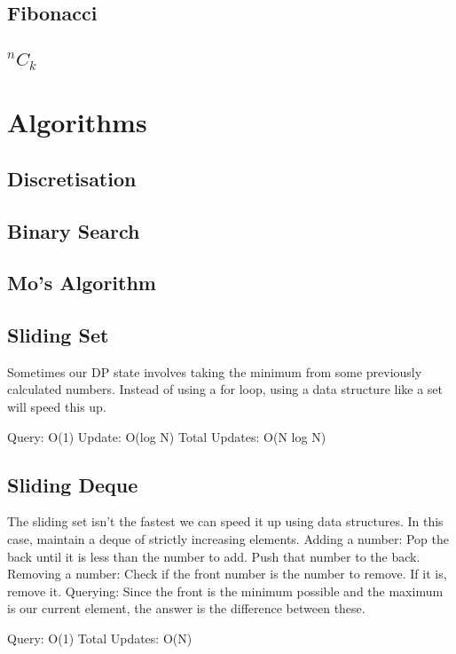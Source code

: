 \documentclass{article}
\begin{document}
\subsection{Fibonacci}

\subsection{\texorpdfstring{$^{n}C_{k}$}{}}


\section{Algorithms}
\subsection{Discretisation}

\subsection{Binary Search}

\subsection{Mo's Algorithm}


\subsection{Sliding Set}
\begin{flushleft}
Sometimes our DP state involves taking the minimum from some previously
calculated numbers. Instead of using a for loop, using a data structure like a
set will speed this up.

Query: O(1)
Update: O(log N)
Total Updates: O(N log N)
\end{flushleft}



\subsection{Sliding Deque}
\begin{flushleft}
The sliding set isn't the fastest we can speed it up using data structures.
In this case, maintain a deque of strictly increasing elements.
\newline
Adding a number: Pop the back until it is less than the number to add. Push that number to the back.
Removing a number: Check if the front number is the number to remove. If it is, remove it.
Querying: Since the front is the minimum possible and the maximum is our current element, the answer is the difference between these.

Query: O(1)
Total Updates: O(N)
\end{flushleft}

\end{document}
